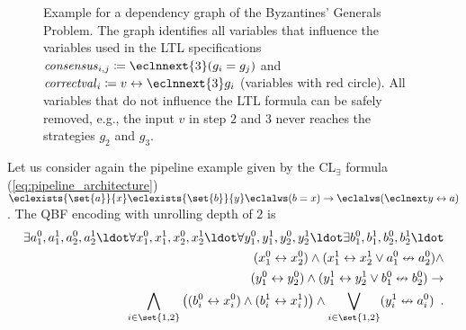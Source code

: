 \documentclass{LMCS}
\newcommand{\consensus}{\mathit{consensus}}
\newcommand{\correctval}{\mathit{correctval}}
\theoremstyle{plain}\newtheorem{theorem}[thm]{Theorem}
\theoremstyle{plain}\newtheorem{lemma}[thm]{Lemma}
\theoremstyle{plain}\newtheorem{proposition}[thm]{Proposition}
\theoremstyle{plain}\newtheorem{corollary}[thm]{Corollary}
\theoremstyle{definition}\newtheorem{definition}{Definition}[section]
\begin{document}
\begin{figure}
{     \label{fig:qbf_encoding_optimization_dependency_graph_after}
  }\caption[]{Example for a dependency graph of the Byzantines' Generals Problem. The graph identifies all variables that influence the variables used in the LTL specifications $\consensus_{i,j} \coloneqq \eclnnext{3} (g_i = g_j)$ and $\correctval_i \coloneqq v \leftrightarrow \eclnnext{3} g_i$ (variables with red circle). All variables that do not influence the LTL formula can be safely removed, e.g., the input $v$ in step $2$ and $3$ never reaches the strategies $g_2$ and $g_3$.}
  \label{fig:qbf_encoding_optimization_dependency_graph}
\end{figure}

Let us consider again the pipeline example given by the CL$_\exists$ formula (\ref{eq:pipeline_architecture}) $\eclexists{\set{a}}{x} \eclexists{\set{b}}{y} \eclalws (b = x) \rightarrow \eclalws (\eclnext y \leftrightarrow a)$.
The QBF encoding with unrolling depth of $2$ is
\begin{align}
  \exists a_1^0, a_1^1, a_2^0, a_2^1 \ldot \forall x_1^0, x_1^1, x_2^0, x_2^1 \ldot \forall y_1^0, y_1^1, y_2^0, y_2^1 \ldot \exists b_1^0, b_1^1, b_2^0, b_2^1 \ldot \nonumber \\
  (x_1^0 \leftrightarrow x_2^0) \land (x_1^1 \leftrightarrow x_2^1 \lor a_1^0 \nleftrightarrow a_2^0) \land \nonumber \\
  (y_1^0 \leftrightarrow y_2^0) \land (y_1^1 \leftrightarrow y_2^1 \lor b_1^0 \nleftrightarrow b_2^0) \rightarrow \nonumber \\
  \bigwedge_{i \in \set{1,2}} \big( (b_i^0 \leftrightarrow x_i^0) \land (b_i^1 \leftrightarrow x_i^1) \big) \land \bigvee_{i \in \set{1,2}} ( y_i^1 \nleftrightarrow a_i^0 ) \enspace.
\end{align}
\end{document}
